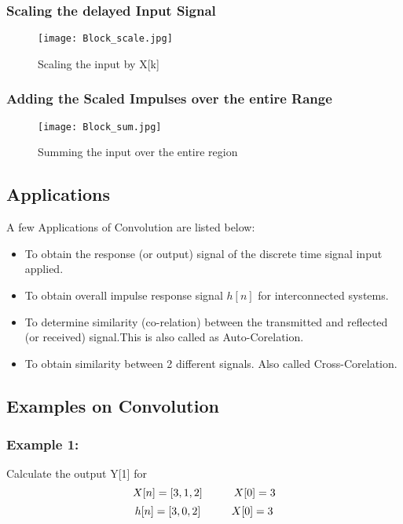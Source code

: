 \subsubsection{Scaling the delayed Input Signal}

\begin{figure}[ht]
\centering
\texttt{[image: Block\_scale.jpg]}
\caption{\label{Step 3:} Scaling the input by X[k]}
\end{figure}

\subsubsection{Adding the Scaled Impulses over the entire Range}

\begin{figure}[ht]
\centering
\texttt{[image: Block\_sum.jpg]}
\caption{\label{Step 4:} Summing the input over the entire region}
\end{figure}


\subsection{Applications}
A few Applications of Convolution are listed below:
\begin{itemize}
\item To obtain the response (or output) signal of the discrete time signal input applied.
\item To obtain overall impulse response signal $h[n]$ for interconnected systems.
\item To determine similarity (co-relation) between the transmitted and reflected (or received) signal.This is also called as Auto-Corelation.
\item To obtain similarity between 2 different signals. Also called Cross-Corelation. 
\end{itemize}


\subsection{Examples on Convolution}
\subsubsection{Example 1:}

Calculate the output Y[1] for 
$$X[n]=[3,1,2]\hspace{10mm}X[0]=3$$
$$h[n]=[3,0,2]\hspace{10mm}X[0]=3$$

